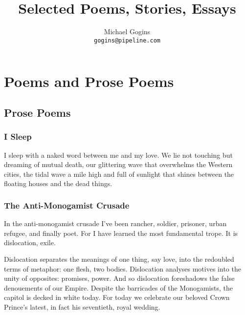 \documentclass[english,11pt,letterpaper,onecolumn]{scrbook}
\begin{document}
\frontmatter

\title{Selected Poems, Stories, Essays}
\author{Michael Gogins \\ \texttt{gogins@pipeline.com}}
\maketitle

\tableofcontents
\mainmatter
\pagestyle{scrheadings}
\cfoot{}
\lefoot{}
\lofoot{\pagemark}
\rofoot{}

\part{Poems and Prose Poems}

\chapter{Prose Poems}

\section{I Sleep}

	I sleep with a naked word between me and my love.  We lie not touching but dreaming of mutual death, our glittering wave that overwhelms the Western cities, the tidal wave a mile high and full of sunlight that shines between the floating houses and the dead things.



\newpage
\section{The Anti-Monogamist Crusade}

	In the anti-monogamist crusade I've been rancher, soldier, prisoner, urban refugee, and finally poet.  For I have learned the most fundamental trope.  It is dislocation, exile.

	Dislocation separates the meanings of one thing, say love, into the redoubled terms of metaphor:  one flesh, two bodies.  Dislocation analyses motives into the unity of opposites:  promises, power.  And so dislocation foreshadows the false denouements of our Empire.  Despite the barricades of the Monogamists, the capitol is decked in white today.  For today we celebrate our beloved Crown Prince's latest, in fact his seventieth, royal wedding.
\end{document}
